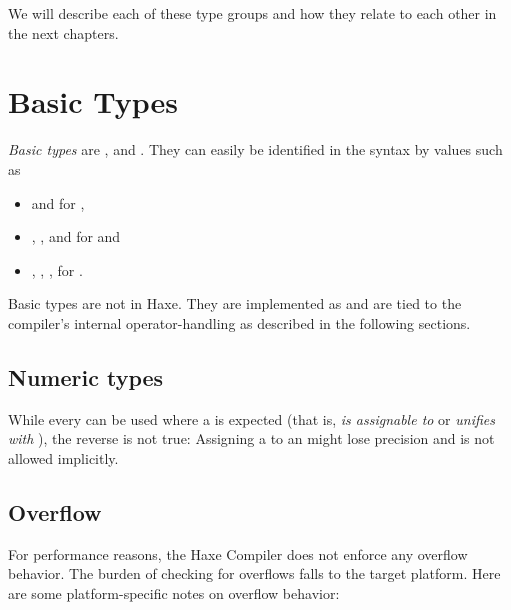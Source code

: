 We will describe each of these type groups and how they relate to each other in the next chapters.



\section{Basic Types}
\label{types-basic-types}

\emph{Basic types} are ,  and . They can easily be identified in the syntax by values such as

\begin{itemize}
	\item {} and  for ,
	\item {}, ,  and  for  and
	\item {}, , ,  for .
\end{itemize}

Basic types are not  in Haxe. They are implemented as  and are tied to the compiler's internal operator-handling as described in the following sections.

\subsection{Numeric types}
\label{types-numeric-types}


While every  can be used where a  is expected (that is,  \emph{is assignable to} or \emph{unifies with} ), the reverse is not true: Assigning a  to an  might lose precision and is not allowed implicitly.

\subsection{Overflow}
\label{types-overflow}

For performance reasons, the Haxe Compiler does not enforce any overflow behavior. The burden of checking for overflows falls to the target platform. Here are some platform-specific notes on overflow behavior:

